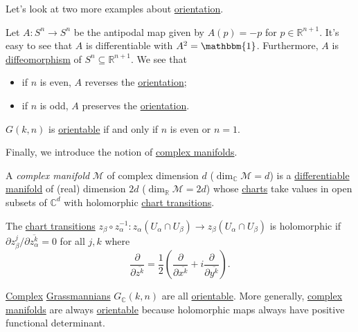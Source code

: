 Let's look at two more examples about \hyperref[def:orientation]{orientation}.

\begin{eg}
	Let \(A\colon S^n \to S^n\) be the antipodal map given by \(A(p) = -p\) for \(p\in \mathbb{R} ^{n+1}\). It's easy to see that \(A\) is differentiable with \(A^2 = \mathbbm{1} \). Furthermore, \(A\) is \hyperref[def:diffeomorphism]{diffeomorphism} of \(S^n \subseteq \mathbb{R} ^{n+1}\). We see that
	\begin{itemize}
		\item if \(n\) is even, \(A\) reverses the \hyperref[def:orientation]{orientation};
		\item if \(n\) is odd, \(A\) preserves the \hyperref[def:orientation]{orientation}.
	\end{itemize}
\end{eg}

\begin{eg}
	\(G(k, n)\) is \hyperref[def:orientation]{orientable} if and only if \(n\) is even or \(n=1\).
\end{eg}

Finally, we introduce the notion of \hyperref[def:complex-manifold]{complex manifolds}.

\begin{definition}\label{def:complex-manifold}
	A \emph{complex manifold} \(\mathcal{M} \) of complex dimension \(d\) (\(\dim _{\mathbb{C} }\mathcal{M} = d\)) is a \hyperref[def:smooth-manifold]{differentiable manifold} of (real) dimension \(2d\) (\(\dim _\mathbb{R} \mathcal{M} =2d\)) whose \hyperref[def:coordinate-chart]{charts} take values in open subsets of \(\mathbb{C} ^d\) with holomorphic \hyperref[def:coordinate-transition]{chart transitions}.
\end{definition}

\begin{prev}
	The \hyperref[def:coordinate-transition]{chart transitions} \(z_\beta \circ z_\alpha ^{-1} \colon z_\alpha (U_\alpha \cap U_\beta ) \to z_\beta (U_\alpha \cap U_\beta )\) is holomorphic if \(\partial z_\beta ^j / \partial \overline{z_\alpha ^k} = 0\) for all \(j, k\) where
	\[
		\frac{\partial }{\partial \overline{z^k}} = \frac{1}{2} \left( \frac{\partial }{\partial \overline{x^k}} + i \frac{\partial }{\partial \overline{y^k}} \right).
	\]
\end{prev}

\begin{remark}
	\hyperref[def:complex-manifold]{Complex} \hyperref[def:Grassmannian-manifold]{Grassmannians} \(G_{\mathbb{C} }(k, n)\) are all \hyperref[def:orientable]{orientable}. More generally, \hyperref[def:complex-manifold]{complex manifolds} are always \hyperref[def:orientable]{orientable} because holomorphic maps always have positive functional determinant.
\end{remark}

